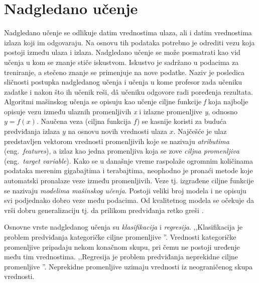 \documentclass[12pt,oneside]{memoir}
\begin{document}
\section{Nadgledano učenje}
Nadgledano učenje se odlikuje datim vrednostima ulaza, ali i datim vrednostima izlaza koji im odgovaraju. Na osnovu tih podataka potrebno je odrediti vezu koja postoji između ulaza i izlaza.%
Nadgledano učenje se može posmatrati kao vid učenja u kom se znanje stiče iskustvom. Iskustvo je sadržano u podacima za treniranje, a stečeno znanje se primenjuje na nove podatke. 
%
Naziv je posledica sličnosti postupka nadgledanog učenja i učenja u kome profesor zada učeniku zadatke i nakon što ih učenik reši, d\^a učeniku odgovore radi poređenja rezultata. Algoritmi mašinskog učenja se opisuju kao učenje ciljne funkcije \textit{f} koja najbolje opisuje vezu između ulaznih promenljivih \textit{x} i izlazne promenljive \textit{y}, odnosno $y=f(x)$. Naučena veza (ciljna funkcija $f$) se kasnije koristi za buduća predviđanja izlaza $y$ na osnovu novih vrednosti ulaza $x$. Najčešće je ulaz predstavljen vektorom vrednosti promenljivih koje se nazivaju \textit{atributima} (eng.~\textit{features}), a izlaz kao jedna promenljiva koja se zove \textit{ciljna promenljiva} (eng.~\textit{target variable}). 
Kako se u današnje vreme raspolaže ogromnim količinama podataka merenim gigabajtima i terabajtima, neophodno je pronaći metode koje automatski pronalaze veze između promenljivih. Veze tj. izgrađene ciljne funkcije se nazivaju \textit{modelima mašinskog učenja}. Postoji veliki broj modela i ne opisuju svi podjednako dobro veze među podacima. Od kvalitetnog modela se očekuje da vrši dobru generalizaciju tj. da prilikom predviđanja retko greši \cite{mladen, mlm, UMLFTA}. %

Osnovne vrste nadgledanog učenja su \textit{klasifikacija} i \textit{regresija}.
,,Klasifikacija je problem predviđanja kategoričke ciljne promenljive \cite{mladen}''. Vrednosti kategoričke promenljive pripadaju nekom konačnom skupu, pri čemu ne postoji uređenje među tim vrednostima. 
,,Regresija je problem predviđanja neprekidne ciljne promenljive \cite{mladen}''.  Neprekidne promenljive uzimaju vrednosti iz neograničenog skupa vrednosti.
\end{document}
